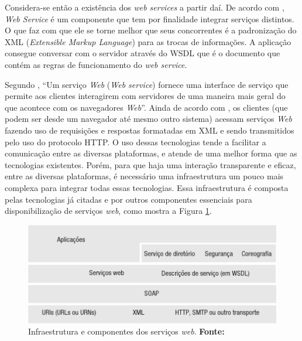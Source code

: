 	\par Considera-se então a existência dos \textit{web services} a partir daí. De
acordo com , \textit{Web Service} é um componente que
tem por finalidade integrar serviços distintos. O que faz com que ele se torne
melhor que seus concorrentes é a padronização do XML (\textit{Extensible Markup
Language}) para as trocas de informações. A aplicação consegue conversar com o
servidor através do  WSDL que é o documento que contém as regras de
funcionamento do \textit{web service}.
	
	\par Segundo , “Um serviço \textit{Web} (\textit{Web
service}) fornece uma interface de serviço que permite aos clientes interagirem
com servidores de uma maneira mais geral do que acontece com os navegadores
\textit{Web}”. Ainda de acordo com , os clientes (que
podem ser desde um navegador até mesmo outro sistema) acessam serviços 
\textit{Web} fazendo uso de requisições e respostas formatadas em XML e sendo
transmitidos pelo uso do protocolo HTTP. O uso dessas tecnologias tende a
facilitar a comunicação entre as diversas plataformas, e atende de uma
melhor forma que as tecnologias existentes. Porém, para que haja uma
interação transparente e eficaz, entre as diversas plataformas, é necessário uma
infraestrutura um pouco mais complexa para integrar todas essas tecnologias.
Essa infraestrutura é composta pelas tecnologias já citadas e por outros
componentes essenciais para disponibilização de serviços \textit{web}, como
mostra a Figura \ref{fig:qt2}.

\begin{figure}[h!]
	\centerline{\includegraphics[scale=0.6]{./imagens/1_q_teorico/qt2.png}}
	\caption[Infraestrutura e componentes dos serviços
		\textit{web}. ]{Infraestrutura e componentes dos serviços
		\textit{web}. \textbf{Fonte:}}
	\label{fig:qt2}
\end{figure}
	
